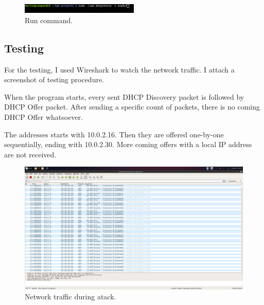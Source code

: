 \documentclass[10pt,a4paper,titlepage]{article}
\begin{document}
\begin{figure}[h!]
    \begin{center}
        \includegraphics[width=0.5\textwidth]{run.png}
        \caption{ Run command. \label{fig:run}}
    \end{center}
\end{figure}


\subsection*{Testing}
For the testing, I used Wireshark to watch the network traffic. I attach a
screenshot of testing procedure.

When the program starts, every sent DHCP Discovery packet is followed by DHCP Offer
packet. After sending a specific count of packets, there is no coming DHCP
Offer whatsoever.

The addresses starts with 10.0.2.16. Then they are offered one-by-one sequentially,
ending with 10.0.2.30. More coming offers with a local IP address are not
received.

\begin{figure}[h!]
    \begin{center}
        \includegraphics[width=1\textwidth]{wireshark.png}
        \caption{ Network traffic during atack. \label{fig:wireshark}}
    \end{center}
\end{figure}

\newpage
\printbibliography
\end{document}
